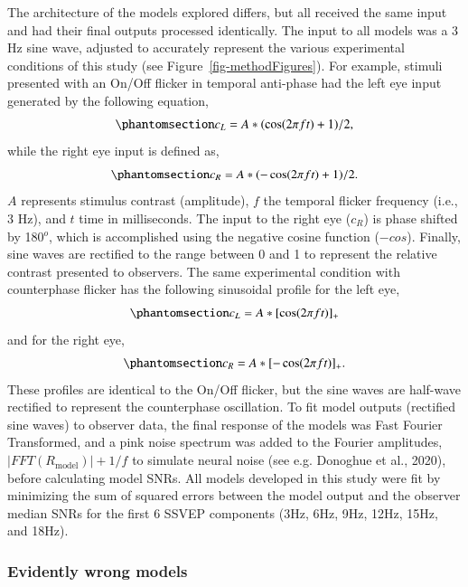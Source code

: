 \documentclass[review,
  12pt,
]{elsarticle}
\begin{document}
The architecture of the models explored differs, but all received the
same input and had their final outputs processed identically. The input
to all models was a 3 Hz sine wave, adjusted to accurately represent the
various experimental conditions of this study (see
Figure~\ref{fig-methodFigures}). For example, stimuli presented with an
On/Off flicker in temporal anti-phase had the left eye input generated
by the following equation,
\begin{equation}\phantomsection\label{eq-stimInput2L}{
c_L = A * (\cos(2 \pi ft)+1)/2,
}\end{equation} while the right eye input is defined as,
\begin{equation}\phantomsection\label{eq-stimInput2R}{
c_R = A * (-\cos(2 \pi ft)+1)/2.
}\end{equation} \(A\) represents stimulus contrast (amplitude), \(f\)
the temporal flicker frequency (i.e., 3 Hz), and \(t\) time in
milliseconds. The input to the right eye (\(c_R\)) is phase shifted by
180\(^o\), which is accomplished using the negative cosine function
(\(-cos\)). Finally, sine waves are rectified to the range between 0 and
1 to represent the relative contrast presented to observers. The same
experimental condition with counterphase flicker has the following
sinusoidal profile for the left eye,
\begin{equation}\phantomsection\label{eq-stimInput3L}{
c_L = A * [\cos(2 \pi ft)]_+
}\end{equation} and for the right eye,
\begin{equation}\phantomsection\label{eq-stimInput3R}{
c_R = A * [-\cos(2 \pi ft)]_+.
}\end{equation} These profiles are identical to the On/Off flicker, but
the sine waves are half-wave rectified to represent the counterphase
oscillation. To fit model outputs (rectified sine waves) to observer
data, the final response of the models was Fast Fourier Transformed, and
a pink noise spectrum was added to the Fourier amplitudes,
\(|FFT(R_\text{model})|+1/f\) to simulate neural noise (see e.g.
Donoghue et al., 2020), before calculating model SNRs. All models
developed in this study were fit by minimizing the sum of squared errors
between the model output and the observer median SNRs for the first 6
SSVEP components (3Hz, 6Hz, 9Hz, 12Hz, 15Hz, and 18Hz).

\subsubsection{Evidently wrong models}\label{evidently-wrong-models}
\end{document}
